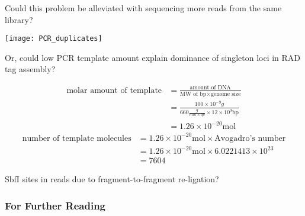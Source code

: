 \documentclass[xcolor=pdftex, dvipsnames, table]{beamer}
\begin{document}
\begin{frame}
\footnotesize
Could this problem be alleviated with sequencing more reads from the same library? 
\begin{center}
\texttt{[image: PCR\_duplicates]}
\end{center}
\vskip10pt
Or, could low PCR template amount explain dominance of singleton loci in RAD tag assembly?
\end{frame}

\begin{frame}
\footnotesize
{\color{RoyalBlue!80}{If I added 100 ng of grasshopper DNA to the PCR mix, assuming that the genome is 12 Gbp long, this would only correspond to 7604 template molecules for the primers.}}
\vskip20pt
\begin{align}
\text{molar amount of template} &= \frac{\text{amount of DNA}}{\text{MW of bp} \times \text{genome size}} \nonumber \\[10pt]
&= \frac{100 \times 10^{-9}g}{660 \frac{g}{mol \times bp} \times 12 \times 10^{9} \text{bp}} \nonumber \\[10pt]
&= 1.26 \times 10^{-20} \text{mol} \nonumber
\end{align}
\begin{align}
\text{number of template molecules} &= 1.26 \times 10^{-20} \text{mol} \times \text{Avogadro's number} \nonumber \\[10pt]
&= 1.26 \times 10^{-20} \text{mol} \times 6.0221413 \times 10^{23} \nonumber \\
&= 7604 \nonumber
\end{align}
\end{frame}

\begin{frame}
\centering
SbfI sites in reads due to fragment-to-fragment re-ligation?
\end{frame}



\begin{frame}[allowframebreaks] %
\frametitle{For Further Reading}
\scriptsize


\end{frame}


\end{document}
